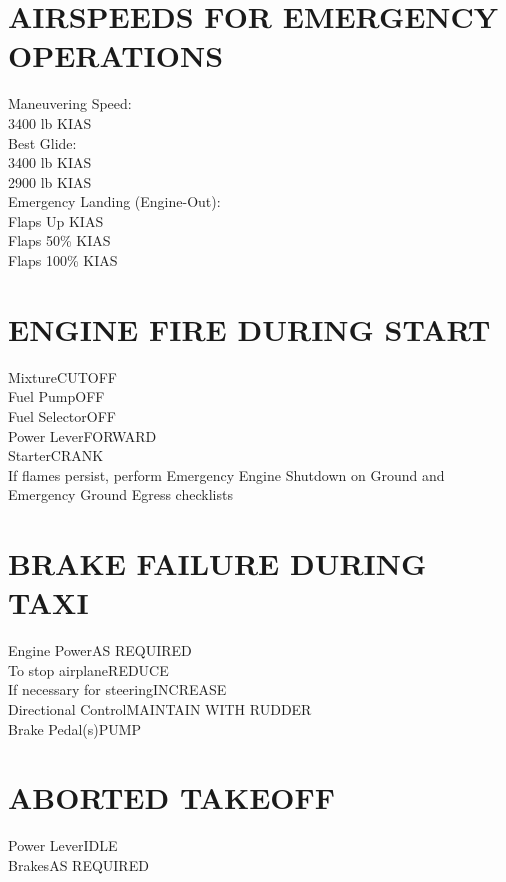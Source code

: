 \documentclass{article}
\begin{document}
\begin{multicols*}{2}
\section*{AIRSPEEDS FOR EMERGENCY OPERATIONS}
Maneuvering Speed:\\
\hspace*{6mm} 3400 lb  KIAS\\
Best Glide:\\
\hspace*{6mm} 3400 lb  KIAS\\
\hspace*{6mm} 2900 lb  KIAS\\
Emergency Landing (Engine-Out):\\
\hspace*{6mm} Flaps Up  KIAS\\
\hspace*{6mm} Flaps 50\%  KIAS\\
\hspace*{6mm} Flaps 100\%  KIAS
\section*{ENGINE FIRE DURING START}
Mixture\dotfill CUTOFF\\
Fuel Pump\dotfill OFF\\
Fuel Selector\dotfill OFF\\
Power Lever\dotfill FORWARD\\
Starter\dotfill CRANK\\
If flames persist, perform Emergency Engine Shutdown on Ground and Emergency Ground Egress checklists
\section*{BRAKE FAILURE DURING TAXI}
Engine Power\dotfill AS REQUIRED\\
\hspace{6mm} To stop airplane\dotfill REDUCE\\
\hspace{6mm} If necessary for steering\dotfill INCREASE\\
Directional Control\dotfill MAINTAIN WITH RUDDER\\
Brake Pedal(s)\dotfill PUMP
\section*{ABORTED TAKEOFF}
Power Lever\dotfill IDLE\\
Brakes\dotfill AS REQUIRED

\end{multicols*}
\end{document}
